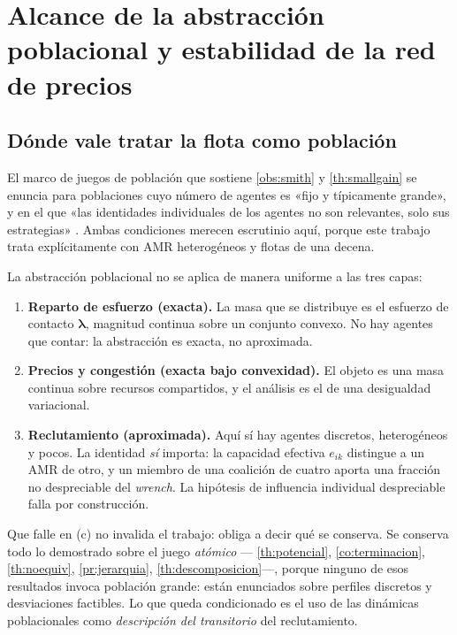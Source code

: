 \section{Alcance de la abstracción poblacional y estabilidad de la red de precios}
\label{sec:alcance}

\subsection{Dónde vale tratar la flota como población}

El marco de juegos de población que sostiene \cref{obs:smith} y
\cref{th:smallgain} se enuncia para poblaciones cuyo número de agentes es
«fijo y típicamente grande», y en el que «las identidades individuales de los
agentes no son relevantes, solo sus estrategias»
\cite{martinezPiazuelo2025gne}. Ambas condiciones merecen escrutinio aquí,
porque este trabajo trata explícitamente con AMR heterogéneos y flotas de una
decena.

\begin{observacion}
\label{obs:alcance-poblacional}
La abstracción poblacional no se aplica de manera uniforme a las tres capas:
\begin{enumerate}[label=(\alph*),leftmargin=2.2em,topsep=0.2em,itemsep=0.15em]
  \item \textbf{Reparto de esfuerzo (exacta).} La masa que se distribuye es el
  esfuerzo de contacto $\bm\lambda$, magnitud continua sobre un conjunto
  convexo. No hay agentes que contar: la abstracción es exacta, no aproximada.
  \item \textbf{Precios y congestión (exacta bajo convexidad).} El objeto es
  una masa continua sobre recursos compartidos, y el análisis es el de una
  desigualdad variacional.
  \item \textbf{Reclutamiento (aproximada).} Aquí sí hay agentes discretos,
  heterogéneos y pocos. La identidad \emph{sí} importa: la capacidad efectiva
  $e_{ik}$ distingue a un AMR de otro, y un miembro de una coalición de cuatro
  aporta una fracción no despreciable del \emph{wrench}. La hipótesis de
  influencia individual despreciable falla por construcción.
\end{enumerate}
\end{observacion}

Que falle en (c) no invalida el trabajo: obliga a decir qué se conserva. Se
conserva todo lo demostrado sobre el juego \emph{atómico} —
\cref{th:potencial}, \cref{co:terminacion}, \cref{th:noequiv},
\cref{pr:jerarquia}, \cref{th:descomposicion}—, porque ninguno de esos
resultados invoca población grande: están enunciados sobre perfiles discretos y
desviaciones factibles. Lo que queda condicionado es el uso de las dinámicas
poblacionales como \emph{descripción del transitorio} del reclutamiento.

